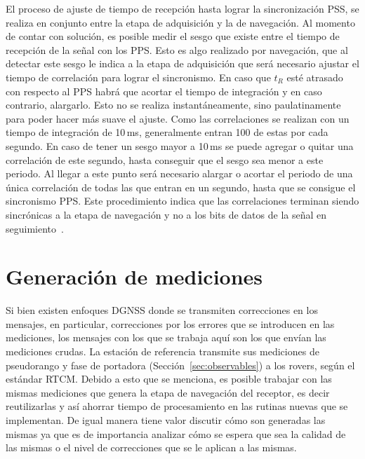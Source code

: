 \documentclass[a4paper,12pt,oneside,onecolumn,final,openright]{book}%
\begin{document}
	El proceso de ajuste de tiempo de recepción hasta lograr la sincronización PSS, se realiza en conjunto entre la etapa de adquisición y la de navegación. Al momento de contar con solución, es posible medir el sesgo que existe entre el tiempo de recepción de la señal con los PPS. Esto es algo realizado por navegación, que al detectar este sesgo le indica a la etapa de adquisición que será necesario ajustar el tiempo de correlación para lograr el sincronismo. En caso que $t_R$ esté atrasado con respecto al PPS habrá que acortar el tiempo de integración y en caso contrario, alargarlo. Esto no se realiza instantáneamente, sino paulatinamente para poder hacer más suave el ajuste. Como las correlaciones se realizan con un tiempo de integración de 10\,ms, generalmente entran 100 de estas por cada segundo. En caso de tener un sesgo mayor a 10\,ms se puede agregar o quitar una correlación de este segundo, hasta conseguir que el sesgo sea menor a este periodo. Al llegar a este punto será necesario alargar o acortar el periodo de una única correlación de todas las que entran en un segundo, hasta que se consigue el sincronismo PPS. Este procedimiento indica que las correlaciones terminan siendo sincrónicas a la etapa de navegación y no a los bits de datos de la señal en seguimiento~\cite{correlation}.
\section{Generación de mediciones}\label{sec:mediciones}
	Si bien existen enfoques DGNSS donde se transmiten correcciones en los mensajes, en particular, correcciones por los errores que se introducen en las mediciones, los mensajes con los que se trabaja aquí son los que envían las mediciones crudas. La estación de referencia transmite sus mediciones de pseudorango y fase de portadora (Sección~\ref{sec:observables}) a los rovers, según el estándar RTCM. Debido a esto que se menciona, es posible trabajar con las mismas mediciones que genera la etapa de navegación del receptor, es decir reutilizarlas y así ahorrar tiempo de procesamiento en las rutinas nuevas que se implementan. De igual manera tiene valor discutir cómo son generadas las mismas ya que es de importancia analizar cómo se espera que sea la calidad de las mismas o el nivel de correcciones que se le aplican a las mismas.
	
\end{document}

